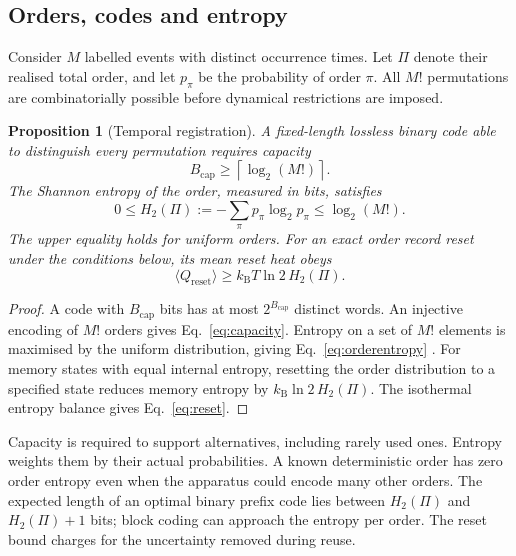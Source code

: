 \documentclass[10pt,a4paper,twocolumn]{article}
\newcommand{\kB}{k_{\mathrm B}}
\newtheorem{proposition}{Proposition}
\numberwithin{equation}{section}
\begin{document}
\subsection{Orders, codes and entropy}

Consider $M$ labelled events with distinct occurrence times. Let $\Pi$ denote their realised total order, and let $p_\pi$ be the probability of order $\pi$. All $M!$ permutations are combinatorially possible before dynamical restrictions are imposed.

\begin{proposition}[Temporal registration]
\label{prop:trb}
A fixed-length lossless binary code able to distinguish every permutation requires capacity
\begin{equation}
B_{\mathrm{cap}}\geq \left\lceil\log_2(M!)\right\rceil .
\label{eq:capacity}
\end{equation}
The Shannon entropy of the order, measured in bits, satisfies
\begin{equation}
0\leq H_2(\Pi):=-\sum_\pi p_\pi\log_2 p_\pi
\leq \log_2(M!).
\label{eq:orderentropy}
\end{equation}
The upper equality holds for uniform orders. For an exact order record reset under the conditions below, its mean reset heat obeys
\begin{equation}
\langle Q_{\mathrm{reset}}\rangle
\geq \kB T\ln 2\,H_2(\Pi).
\label{eq:reset}
\end{equation}
\end{proposition}

\begin{proof}
A code with $B_{\mathrm{cap}}$ bits has at most $2^{B_{\mathrm{cap}}}$ distinct words. An injective encoding of $M!$ orders gives Eq.~\eqref{eq:capacity}. Entropy on a set of $M!$ elements is maximised by the uniform distribution, giving Eq.~\eqref{eq:orderentropy} \cite{coverthomas}. For memory states with equal internal entropy, resetting the order distribution to a specified state reduces memory entropy by $\kB\ln 2\,H_2(\Pi)$. The isothermal entropy balance gives Eq.~\eqref{eq:reset}.
\end{proof}

Capacity is required to support alternatives, including rarely used ones. Entropy weights them by their actual probabilities. A known deterministic order has zero order entropy even when the apparatus could encode many other orders. The expected length of an optimal binary prefix code lies between $H_2(\Pi)$ and $H_2(\Pi)+1$ bits; block coding can approach the entropy per order. The reset bound charges for the uncertainty removed during reuse.
\end{document}
